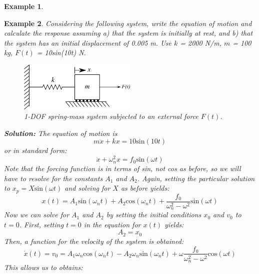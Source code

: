 \documentclass[12pt,letter]{article}
\newtheorem{ex}{Example}
\numberwithin{ex}{section} %
\newenvironment{example}{\begin{mdframed}[middlelinewidth=0.5mm]\begin{ex}\normalfont}{\end{ex}\end{mdframed}}
\numberwithin{re}{section} %
\begin{document}
\begin{example}
\end{example}

\begin{example}
			Considering the following system, write the equation of motion and calculate the response assuming a) that the system is initially at rest, and b) that the system has an initial displacement of 0.005 m. Use $k$ = 2000 N/m, $m$ = 100 kg, $F(t)$ = 10sin(10t) N.
			\begin{figure}[H]
				\centering
				\includegraphics[width=0.5\textwidth]{../Figures/1-DOF-spring_mass_horizontal_forced.png}
				\caption{1-DOF spring-mass system subjected to an external force $F(t)$.}
			\end{figure}
			\noindent\textbf{Solution:} The equation of motion is
			\begin{equation}
				m\ddot{x}+kx=10\text{sin}(10t)
			\end{equation}
			or in standard form:
			\begin{equation}
				\ddot{x}+\omega_n^2x=f_0\text{sin}(\omega t)
			\end{equation}							
			Note that the forcing function is in terms of sin, not cos as before, so we will have to resolve for the constants $A_1$ and $A_2$. Again, setting the particular solution to $x_p=X\text{sin}(\omega t)$ and solving for $X$ as before yields:
			\begin{equation}
				x(t) = A_1\text{sin}(\omega_n t) + A_2\text{cos}(\omega_n t) + \frac{f_0}{\omega_n^2-\omega^2}\text{sin}(\omega t)
			\end{equation}	
			Now we can solve for $A_1$ and $A_2$ by setting the initial conditions $x_0$ and $v_0$ to $t=0$. First, setting $t=0$ in the equation for $x(t)$ yields:
			\begin{equation}
				A_2 = x_0
			\end{equation}	
			Then, a function for the velocity of the system is obtained: 
			\begin{equation}
				\dot{x}(t) = v_0 = A_1\omega_n\text{cos}(\omega_n t) - A_2\omega_n\text{sin}(\omega_n t) + \omega\frac{f_0}{\omega_n^2-\omega^2}\text{cos}(\omega t)
			\end{equation}				
			This allows us to obtains:
			\begin{equation}

\end{equation}
\end{example}
\end{document}
